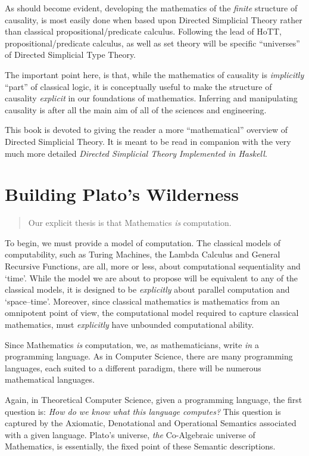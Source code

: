\documentclass[a4paper,openany]{amsbook}
\newenvironment{myQuote}{\begin{quotation}}{\end{quotation}}
\begin{document}
As should become evident, developing the mathematics of the \emph{finite}
structure of causality, is most easily done when based upon Directed Simplicial
Theory rather than classical propositional/predicate calculus. Following the
lead of HoTT, propositional/predicate calculus, as well as set theory will be
specific ``universes'' of Directed Simplicial Type Theory.

The important point here, is that, while the mathematics of causality is
\emph{implicitly} ``part'' of classical logic, it is conceptually useful to make
the structure of causality \emph{explicit} in our foundations of mathematics. 
Inferring and manipulating causality is after all the main aim of all of the
sciences and engineering.

This book is devoted to giving the reader a more ``mathematical'' overview of
Directed Simplicial Theory.  It is meant to be read in companion with the very
much more detailed \textit{Directed Simplicial Theory Implemented in Haskell}.

\section{Building Plato's Wilderness}

\begin{myQuote}
Our explicit thesis is that Mathematics \emph{is} computation.
\end{myQuote}

To begin, we must provide a model of computation. The classical models of
computability, such as Turing Machines, the Lambda Calculus and General
Recursive Functions, are all, more or less, about computational sequentiality
and `time'. While the model we are about to propose will be equivalent to any of
the classical models, it is designed to be \emph{explicitly} about parallel
computation and `space--time'. Moreover, since classical mathematics is
mathematics from an omnipotent point of view, the computational model required
to capture classical mathematics, must \emph{explicitly} have unbounded
computational ability.

Since Mathematics \emph{is} computation, we, as mathematicians, write \emph{in}
a programming language. As in Computer Science, there are many programming
languages, each suited to a different paradigm, there will be numerous
mathematical languages.

Again, in Theoretical Computer Science, given a programming language, the first question
is: \emph{How do we know what this language computes?} This question is captured by the
Axiomatic, Denotational and Operational Semantics associated with a given language.
Plato's universe, \emph{the} Co-Algebraic universe of Mathematics, is essentially, the
fixed point of these Semantic descriptions.
\end{document}
